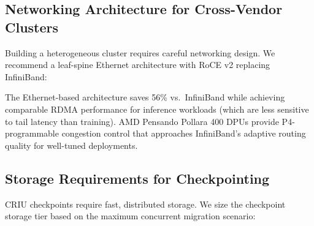 \documentclass[conference,10pt,letterpaper]{IEEEtran}
\begin{document}
\subsection{Networking Architecture for Cross-Vendor Clusters}

Building a heterogeneous cluster requires careful networking design. We recommend a leaf-spine Ethernet architecture with RoCE v2 replacing InfiniBand:

\begin{table}[!t]
\caption{Network Architecture for Mixed Clusters}
\label{tab:network}
\centering\scriptsize
{}
\end{table}

The Ethernet-based architecture saves 56\% vs.\ InfiniBand while achieving comparable RDMA performance for inference workloads (which are less sensitive to tail latency than training). AMD Pensando Pollara 400 DPUs provide P4-programmable congestion control that approaches InfiniBand's adaptive routing quality for well-tuned deployments.

\subsection{Storage Requirements for Checkpointing}

CRIU checkpoints require fast, distributed storage. We size the checkpoint storage tier based on the maximum concurrent migration scenario:
\end{document}
